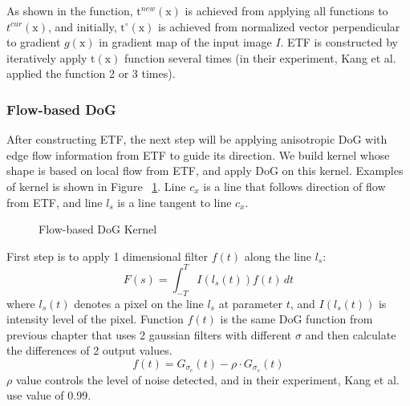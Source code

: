 As shown in the function, $\mbox{t}^{new}(\mbox{x})$ is achieved from applying all functions to $t^{cur}(\mbox{x})$, and initially, $\mbox{t}^{\circ}(\mbox{x})$ is achieved from normalized vector perpendicular to gradient $g(\mbox{x})$ in gradient map of the input image $I$. ETF is constructed by iteratively apply $\mbox{t}(\mbox{x})$ function several times (in their experiment, Kang et al. applied the function 2 or 3 times).


\subsubsection{Flow-based DoG}
After constructing ETF, the next step will be applying anisotropic DoG with edge flow information from ETF to guide its direction. We build kernel whose shape is based on local flow from ETF, and apply DoG on this kernel. Examples of kernel is shown in Figure ~\ref{fig:FDoG_kernel}. Line $c_{x}$ is a line that follows direction of flow from ETF, and line $l_{s}$ is a line tangent to line $c_{x}$. 
\begin{figure}[H]
	\centering
	\caption{Flow-based DoG Kernel}\label{fig:FDoG_kernel}
\end{figure}

First step is to apply 1 dimensional filter $f(t)$ along the line $l_{s}$:
\begin{equation}
	F(s) = \int_{-T}^{T} I(l_s(t))f(t)\,dt
\end{equation}
where $l_s(t)$ denotes a pixel on the line $l_s$ at parameter $t$, and $I(l_s(t))$ is intensity level of the pixel. Function $f(t)$ is the same DoG function from previous chapter that uses 2 gaussian filters with different $\sigma$ and then calculate the differences of 2 output values. 
\begin{equation}
	f(t) = G_{\sigma_{c}}(t)-\rho \cdot G_{\sigma_{s}}(t)
\end{equation}
$\rho$ value controls the level of noise detected, and in their experiment, Kang et al. use value of 0.99.

